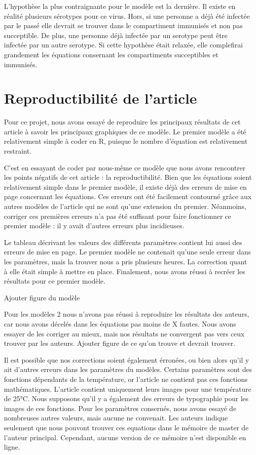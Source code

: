 \documentclass[
  12pt,
  oneside]{article}
\begin{document}
L'hypothèse la plus contraignante pour le modèle est la dernière. Il
existe en réalité plusieurs sérotypes pour ce virus. Hors, si une
personne a déjà été infectée par le passé elle devrait se trouver dans
le compartiment immunisés et non pas succeptible. De plus, une personne
déjà infectée par un serotype peut être infectée par un autre serotype.
Si cette hypothèse était relaxée, elle complefirai grandement les
équations consernant les compartiments succeptibles et immunisés.

\hypertarget{reproductibilituxe9-de-larticle}{%
\section{Reproductibilité de
l'article}\label{reproductibilituxe9-de-larticle}}

Pour ce projet, nous avons essayé de reproduire les principaux résultats
de cet article à savoir les principaux graphiques de ce modèle. Le
premier modèle a été relativement simple à coder en R, puisque le nombre
d'équation est relativement restraint.

C'est en essayant de coder par nous-même ce modèle que nous avons
rencontrer les points négatifs de cet article : la reproductibilité.
Bien que les équations soient relativement simple dans le premier
modèle, il existe déjà des erreurs de mise en page concernant les
équations. Ces erreurs ont été facilement contourné grâce aux autres
modèles de l'article qui ne sont qu'une extension du premier. Néanmoins,
corriger ces premières erreurs n'a pas été suffisant pour faire
fonctionner ce premier modèle : il y avait d'autres erreurs plus
incidieuses.

Le tableau décrivant les valeurs des différents paramètres contient lui
aussi des erreurs de mise en page. Le premier modèle ne contenait qu'une
seule erreur dans les paramètres, mais la trouver nous a pris plusieurs
heures. La correction quant à elle était simple à mettre en place.
Finalement, nous avons réussi à recréer les résultats pour ce premier
modèle.

Ajouter figure du modèle

Pour les modèles 2 nous n'avons pas réussi à reproduire les résultats
des auteurs, car nous avons décelés dans les équations pas moins de X
fautes. Nous avons essayer de les corriger au mieux, mais nos résultats
ne convergent pas vers ceux trouver par les auteurs. Ajouter figure de
ce qu'on trouve et devrait trouver.

Il est possible que nos corrections soient également érronées, ou bien
alors qu'il y ait d'autres erreurs dans les paramètres du modèles.
Certains paramètres sont des fonctions dépendants de la température, or
l'article ne contient pas ces fonctions mathématiques. L'article
contient uniquement leurs images pour une température de 25°C. Nous
supposons qu'il y a également des erreurs de typographie pour les images
de ces fonctions. Pour les paramètres consernés, nous avons essayé de
nombreuses autres valeurs, mais aucune ne convenait. Les auteurs indique
seulement que nous pouvont trouver ces equations dans le mémoire de
master de l'auteur principal. Cependant, aucune version de ce mémoire
n'est disponible en ligne.
\end{document}
